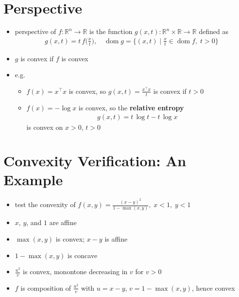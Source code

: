 \documentclass[11pt]{extarticle}
\newcommand{\ds}{\displaystyle}
\DeclareMathOperator*{\dom}{dom}
\theoremstyle{definition}
\begin{document}
\newpage

\section*{Perspective}

\begin{itemize}
  \item perspective of $f:\mathbb{R}^n\to\mathbb{R}$ is the function $\ds g(x, t):\mathbb{R}^n\times\mathbb{R}\to\mathbb{R}$ defined as 
    \begin{align*}
      g(x, t) = t\,f\Big(\frac{x}{t}\Big), \quad\dom g = \Big\{(x, t)\;\Big|\;\frac{x}{t}\in\dom f,\;t > 0\Big\}
    \end{align*}
  \item $g$ is convex if $f$ is convex
  \item e.g.
    \begin{itemize}
      \item $\ds f(x) = x^\top x$ is convex, so $\ds g(x, t) = \frac{x^\top x}{t}$ is convex if $t > 0$
      \item $\ds f(x) = -\log x$ is convex, so the {\bf relative entropy} 
        \begin{align*}
          g(x, t) = t\,\log t - t\,\log x
        \end{align*} 
        is convex on $x > 0$, $t > 0$ 
    \end{itemize}
\end{itemize}

\newpage

\section*{Convexity Verification: An Example}

\begin{itemize}
  \item test the convexity of $\ds f(x, y) = \frac{(x - y)^2}{1 - \max(x, y)}, \; x < 1,\;y < 1$
  \item $x$, $y$, and $1$ are affine
  \item $\max(x, y)$ is convex; $x - y$ is affine
  \item $1 - \max(x, y)$ is concave
  \item $\ds\frac{u^2}{v}$ is convex, monontone decreasing in $v$ for $v > 0$
  \item $f$ is composition of $\ds\frac{u^2}{v}$ with $u = x - y$, $v = 1 - \max(x, y)$, hence convex
\end{itemize}
\end{document}
